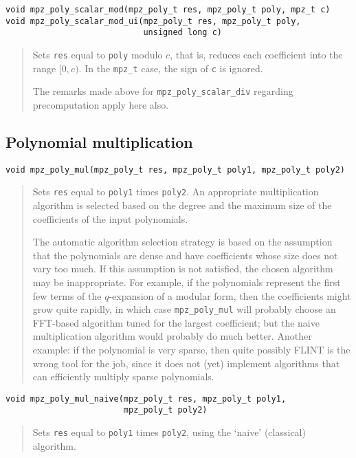 \documentclass[a4paper,10pt]{article}
\newcommand{\code}{\lstinline}
\begin{document}
\begin{lstlisting}
void mpz_poly_scalar_mod(mpz_poly_t res, mpz_poly_t poly, mpz_t c)
void mpz_poly_scalar_mod_ui(mpz_poly_t res, mpz_poly_t poly,
                            unsigned long c)
\end{lstlisting}
\begin{quote}
Sets \code{res} equal to \code{poly} modulo $c$, that is, reduces each coefficient into the range $[0, c)$. In the \code{mpz_t} case, the sign of \code{c} is ignored.

The remarks made above for \code{mpz_poly_scalar_div} regarding precomputation apply here also.
\end{quote}


\subsection{Polynomial multiplication}

\begin{lstlisting}
void mpz_poly_mul(mpz_poly_t res, mpz_poly_t poly1, mpz_poly_t poly2)
\end{lstlisting}
\begin{quote}
Sets \code{res} equal to \code{poly1} times \code{poly2}. An appropriate multiplication algorithm is selected based on the degree and the maximum size of the coefficients of the input polynomials.

The automatic algorithm selection strategy is based on the assumption that the polynomials are dense and have coefficients whose size does not vary too much. If this assumption is not satisfied, the chosen algorithm may be inappropriate. For example, if the polynomials represent the first few terms of the $q$-expansion of a modular form, then the coefficients might grow quite rapidly, in which case \code{mpz_poly_mul} will probably choose an FFT-based algorithm tuned for the largest coefficient; but the naive multiplication algorithm would probably do much better. Another example: if the polynomial is very sparse, then quite possibly FLINT is the wrong tool for the job, since it does not (yet) implement algorithms that can efficiently multiply sparse polynomials.
\end{quote}


\begin{lstlisting}
void mpz_poly_mul_naive(mpz_poly_t res, mpz_poly_t poly1,
                        mpz_poly_t poly2)
\end{lstlisting}
\begin{quote}
Sets \code{res} equal to \code{poly1} times \code{poly2}, using the `naive' (classical) algorithm.
\end{quote}
\end{document}

